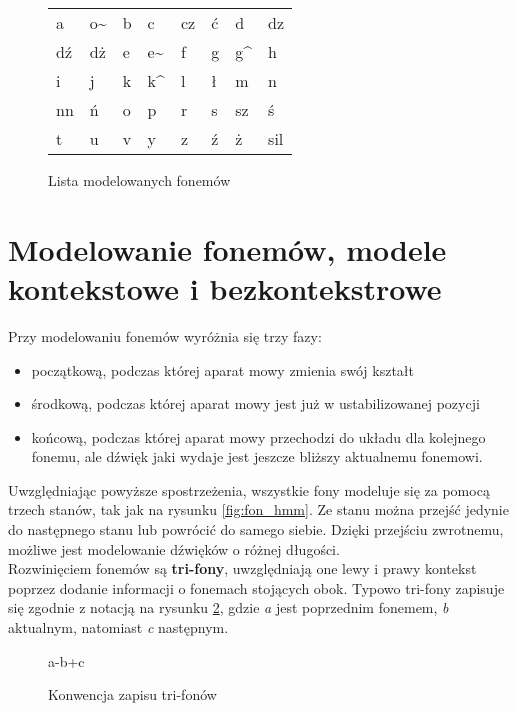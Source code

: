 \documentclass[shortabstract, mgr]{iithesis}
\begin{document}
		\begin{figure}
			\begin{tabular}{|K{1cm}K{1cm}K{1cm}K{1cm}K{1cm}K{1cm}K{1cm}K{1cm}|}
				\hline
				a  & o\~ & b & c & cz & ć & d & dz \\ 
				dź & dż & e & e\~ & f & g & g\^ & h \\
				i & j & k & k\^ & l & ł & m & n \\
				nn & ń & o & p  & r & s & sz & ś \\
				t & u & v & y & z & ź & ż & sil \\
				\hline
			\end{tabular}
			\caption{\label{tab:phone_list}Lista modelowanych fonemów}
		\end{figure}
 

	\section{ Modelowanie fonemów, modele kontekstowe i bezkontekstrowe }
		\label{sec:trifones_definition}
		
		Przy modelowaniu fonemów wyróżnia się trzy fazy:
		\begin{itemize}
			\item początkową, podczas której aparat mowy zmienia swój kształt
			\item środkową, podczas której aparat mowy jest już w ustabilizowanej pozycji
			\item końcową, podczas której aparat mowy przechodzi do układu dla kolejnego fonemu, ale dźwięk jaki wydaje jest jeszcze bliższy aktualnemu fonemowi. 
		\end{itemize}
		Uwzględniając powyższe spostrzeżenia, wszystkie fony modeluje się za pomocą trzech stanów, tak jak na rysunku \ref{fig:fon_hmm}. Ze stanu można przejść jedynie do następnego stanu lub powrócić do samego siebie. Dzięki przejściu zwrotnemu, możliwe jest modelowanie dźwięków o różnej długości. 
		\\
		Rozwinięciem fonemów są \textbf{tri-fony}, uwzględniają one lewy i prawy kontekst poprzez dodanie informacji o fonemach stojących obok. Typowo tri-fony zapisuje się zgodnie z notacją na rysunku \ref{fig:tri-fony_notacja}, gdzie \textit{a} jest poprzednim fonemem, \textit{b} aktualnym, natomiast \textit{c} następnym. 
		
		\begin{figure}[H]
			\begin{center}
			{a-b+c}
			\end{center}
			\caption{Konwencja zapisu tri-fonów}
			\label{fig:tri-fony_notacja}
		\end{figure}
	
\end{document}
